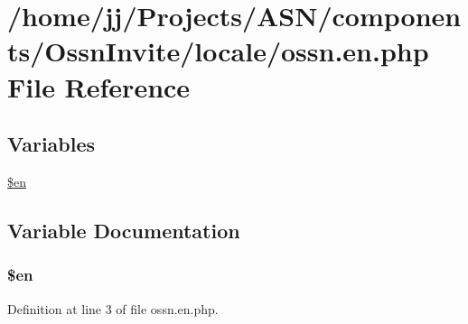 \hypertarget{components_2_ossn_invite_2locale_2ossn_8en_8php}{}\section{/home/jj/\+Projects/\+A\+S\+N/components/\+Ossn\+Invite/locale/ossn.en.\+php File Reference}
\label{components_2_ossn_invite_2locale_2ossn_8en_8php}
\subsection*{Variables}
\begin{DoxyCompactItemize}
\item 
\hyperlink{components_2_ossn_invite_2locale_2ossn_8en_8php_a48abc714dfb71c8fffa83cf49f452115}{\$en}
\end{DoxyCompactItemize}


\subsection{Variable Documentation}
\subsubsection[{\texorpdfstring{\$en}{$en}}]{\setlength{\rightskip}{0pt plus 5cm}\$en}\hypertarget{components_2_ossn_invite_2locale_2ossn_8en_8php_a48abc714dfb71c8fffa83cf49f452115}{}\label{components_2_ossn_invite_2locale_2ossn_8en_8php_a48abc714dfb71c8fffa83cf49f452115}


Definition at line 3 of file ossn.\+en.\+php.

